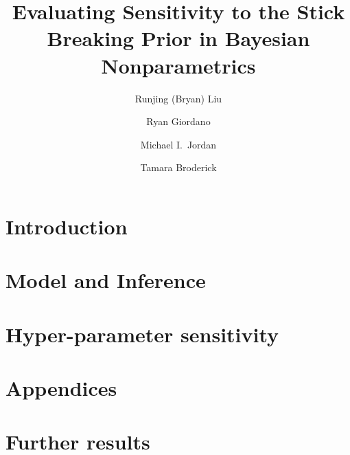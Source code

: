 \documentclass{article}
\title{Evaluating Sensitivity to the Stick Breaking Prior in Bayesian Nonparametrics}
\author[1*]{Runjing (Bryan) Liu}
\author[1*]{Ryan Giordano}
\author[1]{Michael I.~Jordan}
\author[2]{Tamara Broderick}
\affil[*]{These authors contributed equally}
\affil[1]{UC Berkeley}
\affil[2]{MIT}
\begin{document}
\maketitle

\section{Introduction}\label{sec:introduction}


\section{Model and Inference}\label{sec:model}




\section{Hyper-parameter sensitivity}\label{sec:hyper_param_sens}








% 



% 

\newpage



\newpage
\appendix
\section*{Appendices}


\section{Further results}\label{app:results}


\end{document}
